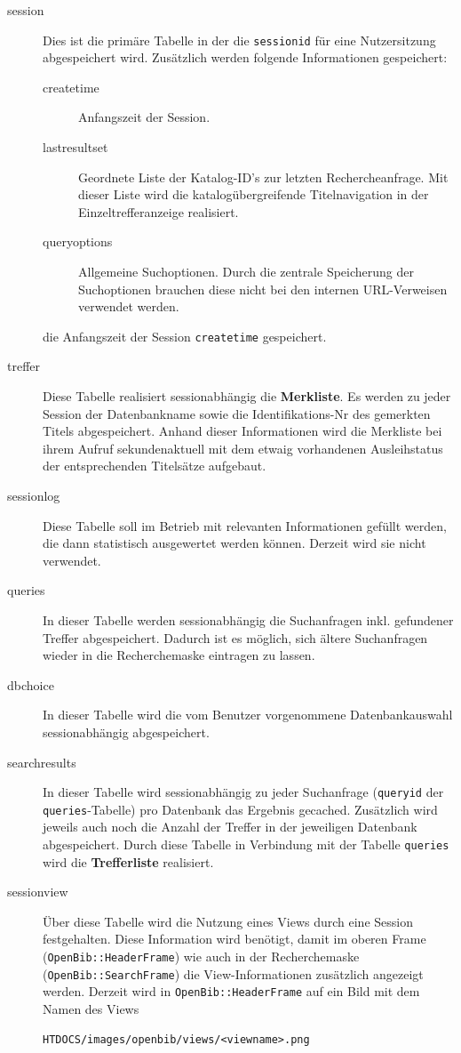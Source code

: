\documentclass[11pt, twoside, a4paper, BCOR8mm, DIV12, bibtotoc,idxtotoc]{scrbook}
\begin{document}
\begin{description}
\item[session] Dies ist die primäre Tabelle in der die
  \texttt{sessionid} für eine Nutzersitzung abgespeichert wird.
  Zusätzlich werden folgende Informationen gespeichert:
  \begin{description}
  \item[createtime] Anfangszeit der Session.
  \item[lastresultset] Geordnete Liste der Katalog-ID's zur letzten
    Rechercheanfrage. Mit dieser Liste wird die katalogübergreifende
    Titelnavigation in der Einzeltrefferanzeige realisiert.
  \item[queryoptions] Allgemeine Suchoptionen. Durch die zentrale Speicherung der
    Suchoptionen brauchen diese nicht bei den internen URL-Verweisen
    verwendet werden.
  \end{description}
die Anfangszeit der Session \texttt{createtime}
  gespeichert. 
\item[treffer] Diese Tabelle realisiert sessionabhängig die
  \textbf{Merkliste}. Es werden zu jeder Session der Datenbankname sowie die
  Identifikations-Nr des gemerkten Titels abgespeichert. Anhand dieser
  Informationen wird die Merkliste bei ihrem Aufruf sekundenaktuell
  mit dem etwaig vorhandenen Ausleihstatus der entsprechenden
  Titelsätze aufgebaut.
\item[sessionlog] Diese Tabelle soll im Betrieb mit relevanten
  Informationen gefüllt werden, die dann statistisch ausgewertet
  werden können. Derzeit wird sie nicht verwendet.
\item[queries] In dieser Tabelle werden sessionabhängig die
  Suchanfragen inkl. gefundener Treffer ab\-ge\-spei\-chert. Dadurch ist es
  möglich, sich ältere Suchanfragen wieder in die Recherchemaske
  eintragen zu lassen.
\item[dbchoice] In dieser Tabelle wird die vom Benutzer vorgenommene
  Datenbankauswahl session\-ab\-hängig abgespeichert.
\item[searchresults] In dieser Tabelle wird session\-ab\-hän\-gig zu jeder
  Suchanfrage (\texttt{queryid} der \texttt{queries}-Tabelle) pro
  Datenbank das Ergebnis gecached. Zusätzlich wird jeweils auch noch
  die Anzahl der Treffer in der jeweiligen Datenbank
  ab\-ge\-spei\-chert. Durch diese Tabelle in Verbindung mit der Tabelle
  \texttt{queries} wird die \textbf{Trefferliste} realisiert.
\item[sessionview] Über diese Tabelle wird die Nutzung eines Views
  durch eine Session festgehalten. Diese Information wird benötigt,
  damit im oberen Frame (\texttt{OpenBib::HeaderFrame}) wie auch in der
  Recherchemaske (\texttt{OpenBib::SearchFrame}) die View-Informationen
  zusätzlich angezeigt werden. Derzeit wird in \texttt{OpenBib::HeaderFrame}
  auf ein Bild mit dem Namen des Views
\begin{verbatim}
HTDOCS/images/openbib/views/<viewname>.png
\end{verbatim}


\end{description}
\end{document}
